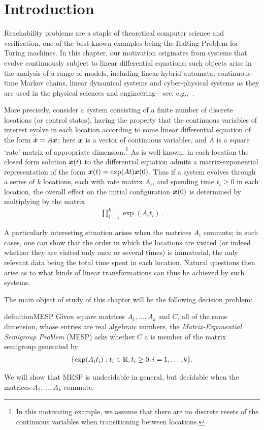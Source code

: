\section{Introduction}

Reachability problems are a staple of theoretical computer
science and verification, one of the best-known examples being the
Halting Problem for Turing machines. In this chapter, our motivation
originates from systems that evolve continuously subject to linear
differential equations; such objects arise in the analysis of a range
of models, including linear hybrid automata, continuous-time Markov
chains, linear dynamical systems and cyber-physical systems as they
are used in the physical sciences and engineering---see,
e.g.,~\cite{Alu15}.

More precisely, consider a system consisting of a finite number of
discrete locations (or control states), having the property that the
continuous variables of interest evolve in each location according to
some linear differential equation of the form $\dot{\boldsymbol{x}} = A
\boldsymbol{x}$; here $\boldsymbol{x}$ is a vector of continuous
variables, and $A$ is a square `rate' matrix of appropriate
dimension.\footnote{In
  this motivating example, we assume that there are no discrete
  resets of the continuous variables when transitioning between
  locations.}
As is well-known, in each location the closed form solution
$\boldsymbol{x}(t)$ to the differential equation admits a
matrix-exponential representation of the form $\boldsymbol{x}(t) =
\exp(At)\boldsymbol{x}(0)$. Thus if a system evolves through a series
of $k$ locations, each with rate matrix $A_i$, and spending time $t_i
\geq 0$ in each location, the overall effect on the initial
configuration $\boldsymbol{x}(0)$ is determined by multiplying by the matrix
\begin{align*}
\prod \limits_{i=1}^{k} \exp(A_{i} t_{i}) \, .
\end{align*}

A particularly interesting situation arises when the matrices $A_i$
commute; in such cases, one can show that the order in which the
locations are visited (or indeed whether they are visited only once or
several times) is immaterial, the only relevant data being the total
time spent in each location. Natural questions then arise as to what
kinds of linear transformations can thus be achieved by such systems.

The main object of study of this chapter will be the following decision problem:
\begin{restatable}{definition}{MESP}
\label{def:MESP}
Given square matrices $A_{1}, \ldots, A_{k}$ and $C$, all of the same
dimension, whose entries are real algebraic numbers, the
\emph{Matrix-Exponential Semigroup Problem} (MESP) asks
whether $C$ a is member of the matrix semigroup generated by
\begin{align*}
    \lbrace \exp(A_{i} t_{i}) : t_{i} \in \mathbb{R}, t_{i} \geq 0, i=1,\ldots,k \rbrace.
\end{align*}
\end{restatable}
We will show that MESP is undecidable in general, but decidable when the matrices $A_{1}, \ldots, A_{k}$ commute.

